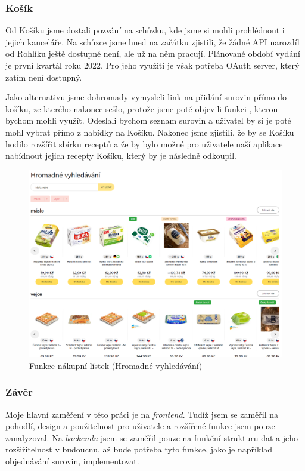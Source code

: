\subsubsection{Košík}
Od Košíku jsme dostali pozvání na schůzku, kde jsme si mohli prohlédnout i jejich kanceláře. Na schůzce jsme hned na začátku
zjistili, že žádné API narozdíl od Rohlíku ještě dostupné není, ale už na něm pracují. Plánované období vydání je
první kvartál roku 2022. Pro jeho využití je však potřeba OAuth server, který zatím není dostupný.

Jako alternativu jsme dohromady vymysleli link na přidání surovin přímo do košíku, ze kterého nakonec sešlo, protože jsme
poté objevili funkci , kterou bychom mohli využít. Odeslali bychom seznam surovin a uživatel by si je poté
mohl vybrat přímo z nabídky na Košíku. Nakonec jsme zjistili, že by se Košíku hodilo rozšířit sbírku receptů a že by bylo možné
pro uživatele naší aplikace nabídnout jejich recepty Košíku, který by je následně odkoupil.

\begin{figure}[H]
    \includegraphics[width=\textwidth]{images/kosik-nakupni-listek}
    \caption{Funkce nákupní lístek (Hromadné vyhledávání)} \label{picture:kosik:nakupni-listek}
\end{figure}

\subsubsection{Závěr}
Moje hlavní zaměření v této práci je na \emph{frontend}. Tudíž jsem se zaměřil na pohodlí, design a použitelnost pro uživatele
a rozšířené funkce jsem pouze zanalyzoval. Na \emph{backendu} jsem se zaměřil pouze na funkční strukturu dat a jeho rozšiřitelnost
v budoucnu, až bude potřeba tyto funkce, jako je například objednávání surovin, implementovat.

